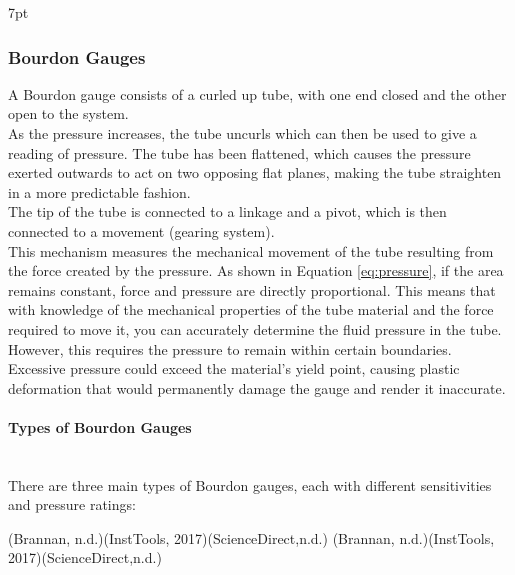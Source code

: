 \documentclass{article}
\newcommand{\formalsource}{} %
\newenvironment{formal}[3][]{%
	\renewcommand{\formalsource}{#1}%
	\def\FrameCommand{%
		\hspace{1pt}%
		{\color{#2}\vrule width 2pt}%
		{\color{#3}\vrule width 4pt}%
		\colorbox{#3}%
	}%
	\MakeFramed{\advance\hsize-\width\FrameRestore}%
	\noindent\hspace{-4.55pt}%
	\begin{adjustwidth}{}{7pt}%
		\vspace{2pt}%
	}%
	{%
		\vspace{4pt}%
		\ifx\formalsource\empty %
		\else
		\hfill{\footnotesize{\formalsource}}%
		\fi
	\end{adjustwidth}\endMakeFramed%
}
\begin{document}
\begin{formal}[(Brannan, n.d.)(InstTools, 2017)(ScienceDirect,n.d.)]{black!50!white}{white!97!gray}
\vspace{-1em}
\subsubsection{Bourdon Gauges}	
A Bourdon gauge consists of a curled up tube, with one end closed and the other open to the system.\\[8pt] 
As the pressure increases, the tube uncurls which can then be used to give a reading of pressure. The tube has been flattened, which causes the pressure exerted outwards to act on two opposing flat planes, making the tube straighten in a more predictable fashion.\\[8pt]
The tip of the tube is connected to a linkage and a pivot, which is then connected to a movement (gearing system).\\[8pt]
This mechanism measures the mechanical movement of the tube resulting from the force created by the pressure. As shown in Equation \ref{eq:pressure}, if the area remains constant, force and pressure are directly proportional. This means that with knowledge of the mechanical properties of the tube material and the force required to move it, you can accurately determine the fluid pressure in the tube.\\[8pt] 
However, this requires the pressure to remain within certain boundaries. Excessive pressure could exceed the material's yield point, causing plastic deformation that would permanently damage the gauge and render it inaccurate.\\\vspace{-2em}
\paragraph{Types of Bourdon Gauges}\mbox{}\\[8pt]
There are three main types of Bourdon gauges, each with different sensitivities and pressure ratings:


\end{formal}
\end{document}
